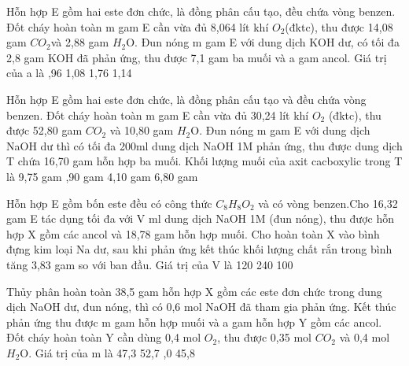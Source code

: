 \begin{ex}[3][(Sở HN – L1 - 2020)]%
Hỗn hợp E gồm hai este đơn chức, là đồng phân cấu tạo, đều chứa vòng benzen. Đốt cháy hoàn toàn m gam E cần vừa đủ 8,064 lít khí ${O}_{2 }$(đktc), thu được 14,08 gam ${CO}_{2 }$và 2,88 gam ${H}_2$O. Đun nóng m gam E với dung dịch KOH dư, có tối đa 2,8 gam KOH đã phản ứng, thu được 7,1 gam ba muối và a gam ancol. Giá trị của a là
	\choice
	{,96}
	{ 1,08}
	{ 1,76}
	{ 1,14}
	\sodongkeex[8]
	\loigiai{%
	
}
\end{ex}

\begin{ex}%
Hỗn hợp E gồm hai este đơn chức, là đồng phân cấu tạo và đều chứa vòng benzen. Đốt cháy hoàn toàn m gam E cần vừa đủ 30,24 lít khí ${O}_2$ (đktc), thu được 52,80 gam ${CO}_2$ và 10,80 gam ${H}_2$O. Đun nóng m gam E với dung dịch NaOH dư thì có tối đa 200ml dung dịch NaOH 1M phản ứng, thu được dung dịch T chứa 16,70 gam hỗn hợp ba muối. Khối lượng muối của axit cacboxylic trong T là
	\choice
	{ 9,75 gam}
	{,90 gam}
	{ 4,10 gam}
	{ 6,80 gam}
	\sodongkeex[8]
	\loigiai
{%
}
\end{ex}



\begin{ex}[3][(QG.18 - 202)]%
Hỗn hợp E gồm bốn este đều có công thức ${C}_8{H}_8{O}_2$ và có vòng benzen.Cho 16,32 gam E tác dụng tối đa với V ml dung dịch NaOH 1M (đun nóng), thu được hỗn hợp X gồm các ancol và 18,78 gam hỗn hợp muối. Cho hoàn toàn X vào bình đựng kim loại Na dư, sau khi phản ứng kết thúc khối lượng chất rắn trong bình tăng 3,83 gam so với ban đầu. Giá trị của V là
	\choice
	{}
	{ 120}
	{ 240}
	{ 100}
	\sodongkeex[8]
	\loigiai{
}
\end{ex}



\begin{ex}[3][(Sở TN – L2 - 2020)]%
Thủy phân hoàn toàn 38,5 gam hỗn hợp X gồm các este đơn chức trong dung dịch NaOH dư, đun nóng, thì có 0,6 mol NaOH đã tham gia phản ứng. Kết thúc phản ứng thu được m gam hỗn hợp muối và a gam hỗn hợp Y gồm các ancol. Đốt cháy hoàn toàn Y cần dùng 0,4 mol ${O}_2$, thu được 0,35 mol ${CO}_2$ và 0,4 mol ${H}_2$O. Giá trị của m là
	\choice
	{ 47,3}
	{ 52,7}
	{,0}
	{ 45,8}
	
	\sodongkeex[8]
	\loigiai
{%
	
}
\end{ex}




